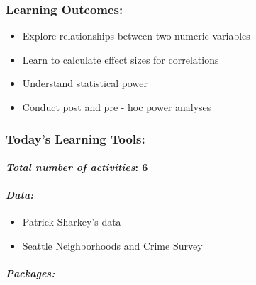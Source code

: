 \documentclass[
]{book}
\providecommand{\tightlist}{%
  \setlength{\itemsep}{0pt}\setlength{\parskip}{0pt}}
\begin{document}
\hypertarget{learning-outcomes-7}{%
\subsubsection*{Learning Outcomes:}\label{learning-outcomes-7}}

\begin{itemize}
\tightlist
\item
  Explore relationships between two numeric variables
\item
  Learn to calculate effect sizes for correlations
\item
  Understand statistical power
\item
  Conduct post and pre - hoc power analyses
\end{itemize}

\hypertarget{todays-learning-tools-7}{%
\subsubsection*{Today's Learning Tools:}\label{todays-learning-tools-7}}

\hypertarget{total-number-of-activities-6}{%
\paragraph*{\texorpdfstring{\emph{Total number of activities}: 6}{Total number of activities: 6}}\label{total-number-of-activities-6}}

\hypertarget{data-7}{%
\paragraph*{\texorpdfstring{\emph{Data:}}{Data:}}\label{data-7}}

\begin{itemize}
\tightlist
\item
  Patrick Sharkey's data
\item
  Seattle Neighborhoods and Crime Survey
\end{itemize}

\hypertarget{packages-8}{%
\paragraph*{\texorpdfstring{\emph{Packages:}}{Packages:}}\label{packages-8}}
\end{document}
